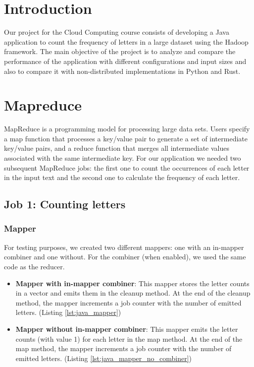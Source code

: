 \documentclass{article}
\begin{document}
\begin{multicols}{2}
\section{Introduction}
    Our project for the Cloud Computing course consists of developing a Java application to count
    the frequency of letters in a large dataset using the Hadoop framework.
    The main objective of the project is to analyze and compare the performance of the application
    with different configurations and input sizes and also to compare it with non-distributed
    implementations in Python and Rust.
\section{Mapreduce}
    MapReduce is a programming model for processing large data sets. 
    Users specify a map function that processes a key/value pair to generate a set
    of intermediate key/value pairs, and a reduce function that merges all intermediate values
    associated with the same intermediate key.
    For our application we needed two subsequent MapReduce jobs: the first one to count the occurrences
    of each letter in the input text and the second one to calculate the frequency of each letter.
    \subsection{Job 1: Counting letters}
        \subsubsection{Mapper}
            For testing purposes, we created two different mappers: one with an in-mapper combiner and one 
            without.
            For the combiner (when enabled), we used the same code as the reducer.
            \begin{itemize}
                \item \textbf{Mapper with in-mapper combiner}:
                This mapper stores the letter counts in a vector and emits them in the cleanup method.
                At the end of the cleanup method, the mapper increments a job counter with the number of emitted 
                letters.
                (Listing \ref{lst:java_mapper})
                \item \textbf{Mapper without in-mapper combiner}: 
                This mapper emits the letter counts (with value 1) for each letter in the map method.
                At the end of the map method, the mapper increments a job counter with the number of emitted
                letters.
                (Listing \ref{lst:java_mapper_no_combiner})
            \end{itemize}

\end{multicols}
\end{document}
